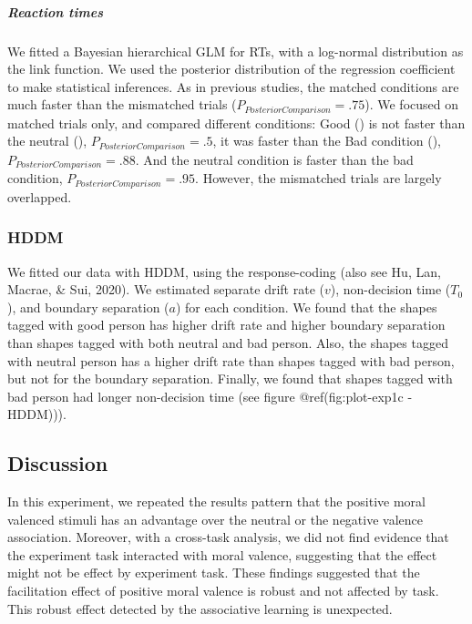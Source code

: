 \documentclass[
  english,
  man]{apa6}
\let\oldsubparagraph\subparagraph
\renewcommand{\subparagraph}[1]{\oldsubparagraph{#1}\mbox{}}
\begin{document}
\hypertarget{reaction-times-2}{%
\subparagraph{Reaction times}\label{reaction-times-2}}

We fitted a Bayesian hierarchical GLM for RTs, with a log-normal distribution as the link function. We used the posterior distribution of the regression coefficient to make statistical inferences. As in previous studies, the matched conditions are much faster than the mismatched trials (\(P_{PosteriorComparison} = .75\)). We focused on matched trials only, and compared different conditions: Good () is not faster than the neutral (), \(P_{PosteriorComparison} = .5\), it was faster than the Bad condition (), \(P_{PosteriorComparison} = .88\). And the neutral condition is faster than the bad condition, \(P_{PosteriorComparison} = .95\). However, the mismatched trials are largely overlapped.

\hypertarget{hddm-3}{%
\subsubsection{HDDM}\label{hddm-3}}

We fitted our data with HDDM, using the response-coding (also see Hu, Lan, Macrae, \& Sui, 2020). We estimated separate drift rate (\(v\)), non-decision time (\(T_{0}\)), and boundary separation (\(a\)) for each condition. We found that the shapes tagged with good person has higher drift rate and higher boundary separation than shapes tagged with both neutral and bad person. Also, the shapes tagged with neutral person has a higher drift rate than shapes tagged with bad person, but not for the boundary separation. Finally, we found that shapes tagged with bad person had longer non-decision time (see figure @ref(fig:plot-exp1c
-HDDM))).

\hypertarget{discussion-1}{%
\subsection{Discussion}\label{discussion-1}}

In this experiment, we repeated the results pattern that the positive moral valenced stimuli has an advantage over the neutral or the negative valence association. Moreover, with a cross-task analysis, we did not find evidence that the experiment task interacted with moral valence, suggesting that the effect might not be effect by experiment task.
These findings suggested that the facilitation effect of positive moral valence is robust and not affected by task. This robust effect detected by the associative learning is unexpected.
\end{document}

